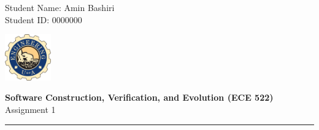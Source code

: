 \documentclass[11pt,letterpaper]{article}
\begin{document}
\pagestyle{plain}

\begin{flushleft}
Student Name: Amin Bashiri\\
Student ID: 0000000
\end{flushleft}

\begin{flushright}\vspace{-15mm}
\includegraphics[height=2cm]{logo.png}
\end{flushright}
 
\begin{center}\vspace{-1cm}
\textbf{\large Software Construction, Verification, and Evolution (ECE 522)}\\
Assignment 1
\end{center}

 
\rule{\linewidth}{0.1mm}

\bigskip
\bigskip
\end{document}
